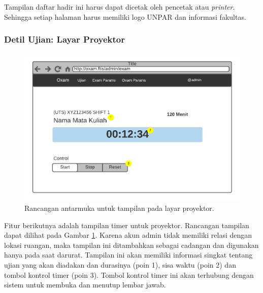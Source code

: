     Tampilan daftar hadir ini harus dapat dicetak oleh pencetak atau
    \textit{printer}. Sehingga setiap halaman harus memiliki logo UNPAR dan
    informasi fakultas.
    
\subsubsection{Detil Ujian: Layar Proyektor}
    \begin{figure}
        \centering
        \includegraphics{Gambar/mockups/Mockup--Admin - Layar Proyektor.pdf}
        \caption{Rancangan antarmuka untuk tampilan pada layar proyektor.}
        \label{fig:mockup_admin_det_projector}
    \end{figure}
    
    Fitur berikutnya adalah tampilan timer untuk proyektor. Rancangan tampilan
    dapat dilihat pada Gambar \ref{fig:mockup_admin_det_projector}. Karena akun
    admin tidak memiliki relasi dengan lokasi ruangan, maka tampilan ini
    ditambahkan sebagai cadangan dan digunakan hanya pada saat darurat. Tampilan
    ini akan memiliki informasi singkat tentang ujian yang akan diadakan dan
    durasinya (poin 1), sisa waktu (poin 2) dan tombol kontrol timer (poin 3).
    Tombol kontrol timer ini akan terhubung dengan sistem untuk membuka dan
    menutup lembar jawab.
    

